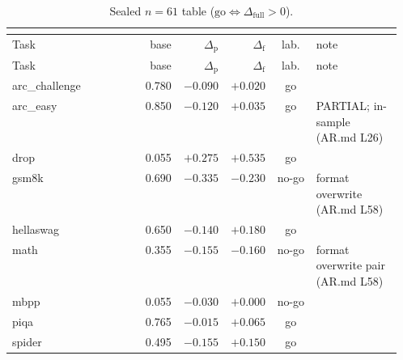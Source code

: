 \setlength{\tabcolsep}{3pt}
\begin{longtable}{@{}p{0.34\linewidth}rrrcp{0.22\linewidth}@{}}
\caption{Sealed $n{=}61$ table ($\mathrm{go}\Leftrightarrow\Delta_{\mathrm{full}}>0$).}\\
\label{tab:all61}\\
\toprule
\scriptsize Task & \scriptsize base & \scriptsize $\Delta_{\mathrm{p}}$ & \scriptsize $\Delta_{\mathrm{f}}$ & \scriptsize lab. & \scriptsize note \\
\midrule
\endfirsthead
\toprule
\scriptsize Task & \scriptsize base & \scriptsize $\Delta_{\mathrm{p}}$ & \scriptsize $\Delta_{\mathrm{f}}$ & \scriptsize lab. & \scriptsize note \\
\midrule
\endhead
\bottomrule
\endfoot
\scriptsize arc\_\hspace{0pt}challenge & \scriptsize 0.780 & \scriptsize $-0.090$ & \scriptsize $+0.020$ & \scriptsize go & \scriptsize  \\
\scriptsize arc\_\hspace{0pt}easy & \scriptsize 0.850 & \scriptsize $-0.120$ & \scriptsize $+0.035$ & \scriptsize go & \scriptsize PARTIAL; in-sample (AR.md L26) \\
\scriptsize drop & \scriptsize 0.055 & \scriptsize $+0.275$ & \scriptsize $+0.535$ & \scriptsize go & \scriptsize  \\
\scriptsize gsm8k & \scriptsize 0.690 & \scriptsize $-0.335$ & \scriptsize $-0.230$ & \scriptsize no-go & \scriptsize format overwrite (AR.md L58) \\
\scriptsize hellaswag & \scriptsize 0.650 & \scriptsize $-0.140$ & \scriptsize $+0.180$ & \scriptsize go & \scriptsize  \\
\scriptsize math & \scriptsize 0.355 & \scriptsize $-0.155$ & \scriptsize $-0.160$ & \scriptsize no-go & \scriptsize format overwrite pair (AR.md L58) \\
\scriptsize mbpp & \scriptsize 0.055 & \scriptsize $-0.030$ & \scriptsize $+0.000$ & \scriptsize no-go & \scriptsize  \\
\scriptsize piqa & \scriptsize 0.765 & \scriptsize $-0.015$ & \scriptsize $+0.065$ & \scriptsize go & \scriptsize  \\
\scriptsize spider & \scriptsize 0.495 & \scriptsize $-0.155$ & \scriptsize $+0.150$ & \scriptsize go & \scriptsize  \\

\end{longtable}
